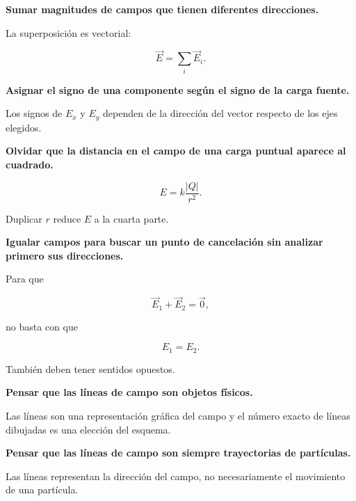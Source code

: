 \begin{errorfrecuente}

\textbf{Sumar magnitudes de campos que tienen diferentes direcciones.}

La superposición es vectorial:

\[
\vec E=\sum_i\vec E_i.
\]

\end{errorfrecuente}

\begin{errorfrecuente}

\textbf{Asignar el signo de una componente según el signo de la carga fuente.}

Los signos de \(E_x\) y \(E_y\) dependen de la dirección del vector respecto de los
ejes elegidos.

\end{errorfrecuente}

\begin{errorfrecuente}

\textbf{Olvidar que la distancia en el campo de una carga puntual aparece al
cuadrado.}

\[
E=k\frac{|Q|}{r^2}.
\]

Duplicar \(r\) reduce \(E\) a la cuarta parte.

\end{errorfrecuente}

\begin{errorfrecuente}

\textbf{Igualar campos para buscar un punto de cancelación sin analizar primero sus
direcciones.}

Para que

\[
\vec E_1+\vec E_2=\vec 0,
\]

no basta con que

\[
E_1=E_2.
\]

También deben tener sentidos opuestos.

\end{errorfrecuente}

\begin{errorfrecuente}

\textbf{Pensar que las líneas de campo son objetos físicos.}

Las líneas son una representación gráfica del campo y el número exacto de líneas
dibujadas es una elección del esquema.

\end{errorfrecuente}

\begin{errorfrecuente}

\textbf{Pensar que las líneas de campo son siempre trayectorias de partículas.}

Las líneas representan la dirección del campo, no necesariamente el movimiento de una
partícula.

\end{errorfrecuente}


